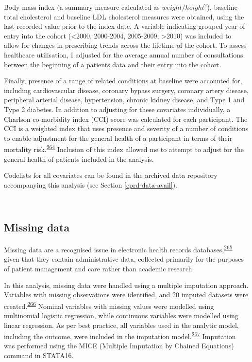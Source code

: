 \documentclass[a4paper, twoside]{templates/ociamthesis}
\begin{document}
Body mass index (a summary measure calculated as \(weight/height^2\)), baseline total cholesterol and baseline LDL cholesterol measures were obtained, using the last recorded value prior to the index date. A variable indicating grouped year of entry into the cohort (\textless2000, 2000-2004, 2005-2009, \textgreater2010) was included to allow for changes in prescribing trends across the lifetime of the cohort. To assess healthcare utilisation, I adjusted for the average annual number of consultations between the beginning of a patients data and their entry into the cohort.

Finally, presence of a range of related conditions at baseline were accounted for, including cardiovascular disease, coronary bypass surgery, coronary artery disease, peripheral arterial disease, hypertension, chronic kidney disease, and Type 1 and Type 2 diabetes. In addition to adjusting for these covariates individually, a Charlson co-morbidity index (CCI) score was calculated for each participant. The CCI is a weighted index that uses presence and severity of a number of conditions to enable adjustment for the general health of a participant in terms of their mortality risk.\textsuperscript{\protect\hyperlink{ref-charlson1987new}{264}} Inclusion of this index allowed me to attempt to adjust for the general health of patients included in the analysis.

Codelists for all covariates can be found in the archived data repository accompanying this analysis (see Section \ref{cprd-data-avail}).

~

\hypertarget{missing-data}{%
\subsection{Missing data}\label{missing-data}}

Missing data are a recognised issue in electronic health records databases,\textsuperscript{\protect\hyperlink{ref-wells2013strategies}{265}} given that they contain administrative data, collected primarily for the purposes of patient management and care rather than academic research.

In this analysis, missing data were handled using a multiple imputation approach. Variables with missing observations were identified, and 20 imputed datasets were created.\textsuperscript{\protect\hyperlink{ref-sterne2009}{266}} Nominal variables with missing values were modelled using multinomial logistic regression, while continuous variables were modelled using linear regression. As per best practice, all variables used in the analytic model, including the outcome, were included in the imputation model.\textsuperscript{\protect\hyperlink{ref-moons2006using}{267}} Imputation was performed using the MICE (Multiple Imputation by Chained Equations) command in STATA16.
\end{document}
